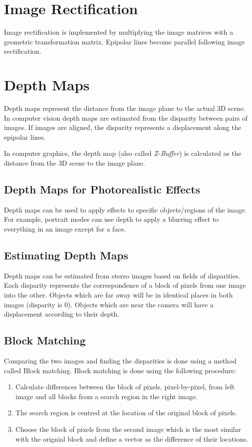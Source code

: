 \documentclass{article}
\begin{document}
\section{Image Rectification}
Image rectification is implemented by multiplying the image matrices with a geometric transformation matrix.
Epipolar lines become parallel following image rectification.

\section{Depth Maps}
Depth maps represent the distance from the image plane to the actual 3D scene.
In computer vision depth maps are estimated from the disparity between pairs of images.
If images are aligned, the disparity represents a displacement along the epipolar lines.

In computer graphics, the depth map (also called \textit{Z-Buffer}) is calculated as the distance from the 3D scene to the image plane.

\subsection{Depth Maps for Photorealistic Effects}
Depth maps can be used to apply effects to specific objects/regions of the image.
For example, portrait modes can use depth to apply a blurring effect to everything in an image except for a face.

\subsection{Estimating Depth Maps}
Depth maps can be estimated from stereo images based on fields of disparities.
Each disparity represents the correspondence of a block of pixels from one image into the other.
Objects which are far away will be in identical places in both images (disparity is 0).
Objects which are near the camera will have a displacement according to their depth.

\subsection{Block Matching}
Comparing the two images and finding the disparities is done using a method called Block matching.
Block matching is done using the following procedure:
\begin{enumerate}
	\item Calculate differences between the block of pixels, pixel-by-pixel, from left image and all blocks from a search region in the right image.
	\item The search region is centred at the location of the original block of pixels.
	\item Choose the block of pixels from the second image which is the most similar with the orignial block and define a vector as the difference of their locations.
\end{enumerate}
\end{document}

